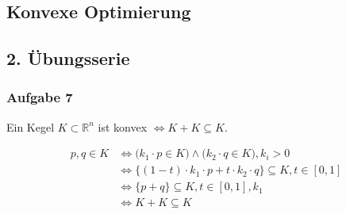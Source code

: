 \documentclass{article}
\begin{document}
\begin{center}
	\section*{Konvexe Optimierung}
	\subsection*{2. Übungsserie}
\end{center}

\subsubsection*{Aufgabe 7}
\begin{center}
Ein Kegel $K \subset  \mathbb{R}^n$ ist konvex $\Leftrightarrow K + K \subseteq K$.
\end{center}


\begin{equation}
\begin{split}
p,q \in K &\Leftrightarrow \big(k_1 \cdot p \in K\big) \land \big(k_2 \cdot q \in K\big) ,k_i > 0\\
&\Leftrightarrow \{ (1-t)\cdot k_1\cdot p + t\cdot k_2\cdot q \} \subseteq K,t \in \left[0,1 \right]\\
&\Leftrightarrow \{ p + q \} \subseteq K,t \in \left[0,1 \right],k_1\\
&\Leftrightarrow K + K \subseteq K
\end{split}
\end{equation}



%
%
%
%
\end{document}
